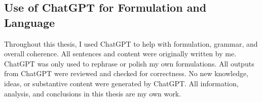 \begin{appendices}
\subsection{Use of ChatGPT for Formulation and Language}

Throughout this thesis, I used ChatGPT to help with formulation, grammar, and overall coherence. All sentences and content were originally written by me. ChatGPT was only used to rephrase or polish my own formulations. All outputs from ChatGPT were reviewed and checked for correctness. No new knowledge, ideas, or substantive content were generated by ChatGPT. All information, analysis, and conclusions in this thesis are my own work.


\end{appendices}
